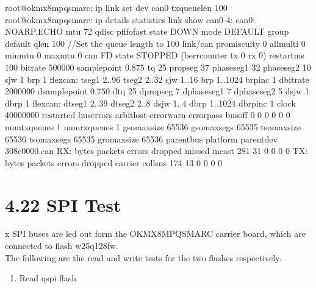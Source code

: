 \documentclass[letterpaper,10pt,openany,english]{sphinxmanual}
\begin{document}
\begin{sphinxVerbatim}[commandchars=\\\{\}]
root@ok\PYGZhy{}mx8mpq\PYGZhy{}smarc:\PYGZti{}\PYGZsh{} ip link set dev can0 txqueuelen 100
root@ok\PYGZhy{}mx8mpq\PYGZhy{}smarc:\PYGZti{}\PYGZsh{} ip \PYGZhy{}details \PYGZhy{}statistics link show can0
4: can0: \PYGZlt{}NOARP,ECHO\PYGZgt{} mtu 72 qdisc pfifo\PYGZus{}fast state DOWN mode DEFAULT group default qlen 100                                              //Set the queue length to 100
    link/can  promiscuity 0  allmulti 0 minmtu 0 maxmtu 0 
    can \PYGZlt{}FD\PYGZgt{} state STOPPED (berr\PYGZhy{}counter tx 0 rx 0) restart\PYGZhy{}ms 100 
          bitrate 500000 sample\PYGZhy{}point 0.875
          tq 25 prop\PYGZhy{}seg 37 phase\PYGZhy{}seg1 32 phase\PYGZhy{}seg2 10 sjw 1 brp 1
          flexcan: tseg1 2..96 tseg2 2..32 sjw 1..16 brp 1..1024 brp\PYGZus{}inc 1
          dbitrate 2000000 dsample\PYGZhy{}point 0.750
          dtq 25 dprop\PYGZhy{}seg 7 dphase\PYGZhy{}seg1 7 dphase\PYGZhy{}seg2 5 dsjw 1 dbrp 1
          flexcan: dtseg1 2..39 dtseg2 2..8 dsjw 1..4 dbrp 1..1024 dbrp\PYGZus{}inc 1
          clock 40000000
          re\PYGZhy{}started bus\PYGZhy{}errors arbit\PYGZhy{}lost error\PYGZhy{}warn error\PYGZhy{}pass bus\PYGZhy{}off
          0          0          0          0          0          0         numtxqueues 1 numrxqueues 1 gso\PYGZus{}max\PYGZus{}size 65536 gso\PYGZus{}max\PYGZus{}segs 65535 tso\PYGZus{}max\PYGZus{}size 65536 tso\PYGZus{}max\PYGZus{}segs 65535 gro\PYGZus{}max\PYGZus{}size 65536 parentbus platform parentdev 308c0000.can 
    RX:  bytes packets errors dropped  missed   mcast           
           281      31      0       0       0       0
           TX:  bytes packets errors dropped carrier collsns           
           174      13      0       0       0       0
\end{sphinxVerbatim}


\section{4.22 SPI Test}
\label{\detokenize{linux-manual:spi-test}}
 x SPI buses are led out form the OK\sphinxhyphen{}MX8MPQ\sphinxhyphen{}SMARC carrier board, which are connected to flash w25q128fw.\\
The following are the read and write tests for the two flashes respectively.
\begin{enumerate}
%
\item {} 
\sphinxAtStartPar
Read qspi flash

\end{enumerate}
\end{document}
